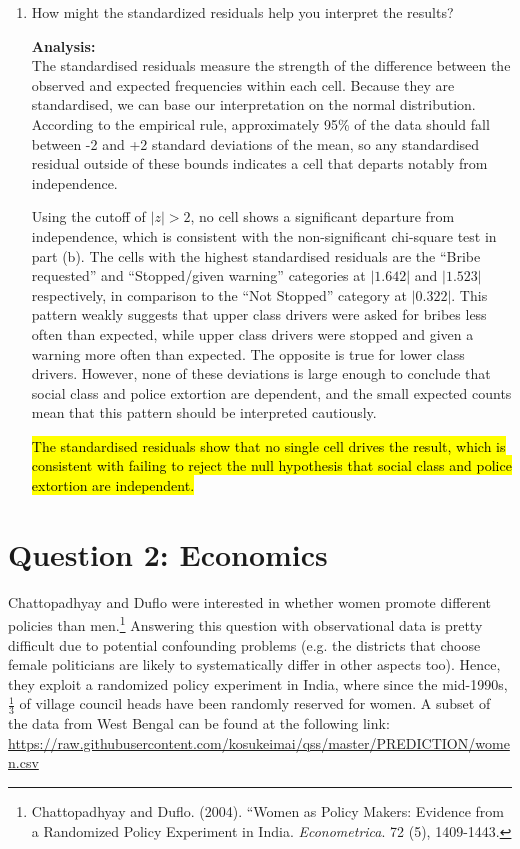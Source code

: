 \documentclass[12pt,letterpaper]{article}
\begin{document}
\begin{enumerate}
	
	\item [(d)] How might the standardized residuals help you interpret the results?  
	
	\textbf{Analysis:}\\
	The standardised residuals measure the strength of the difference between the observed and expected frequencies within each cell. Because they are standardised, we can base our interpretation on the normal distribution. According to the empirical rule, approximately 95\% of the data should fall between -2 and +2 standard deviations of the mean, so any standardised residual outside of these bounds indicates a cell that departs notably from independence. 
	
	Using the cutoff of $|z| > 2$, no cell shows a significant departure from independence, which is consistent with the non-significant chi-square test in part (b). The cells with the highest standardised residuals are the ``Bribe requested'' and ``Stopped/given warning'' categories at $|1.642|$ and $|1.523|$ respectively, in comparison to the ``Not Stopped'' category at $|0.322|$. This pattern weakly suggests that upper class drivers were asked for bribes less often than expected, while upper class drivers were stopped and given a warning more often than expected. The opposite is true for lower class drivers. However, none of these deviations is large enough to conclude that social class and police extortion are dependent, and the small expected counts mean that this pattern should be interpreted cautiously.
	
	\hl{The standardised residuals show that no single cell drives the result, which is consistent with failing to reject the null hypothesis that social class and police extortion are independent.}
	
\end{enumerate}

\newpage
	
\section*{Question 2: Economics}
Chattopadhyay and Duflo were interested in whether women promote different policies than men.\footnote{Chattopadhyay and Duflo. (2004). ``Women as Policy Makers: Evidence from a Randomized Policy Experiment in India. \textit{Econometrica}. 72 (5), 1409-1443.} Answering this question with observational data is pretty difficult due to potential confounding problems (e.g. the districts that choose female politicians are likely to systematically differ in other aspects too). Hence, they exploit a randomized policy experiment in India, where since the mid-1990s, $\frac{1}{3}$ of village council heads have been randomly reserved for women. A subset of the data from West Bengal can be found at the following link: \url{https://raw.githubusercontent.com/kosukeimai/qss/master/PREDICTION/women.csv}\\
\end{document}
